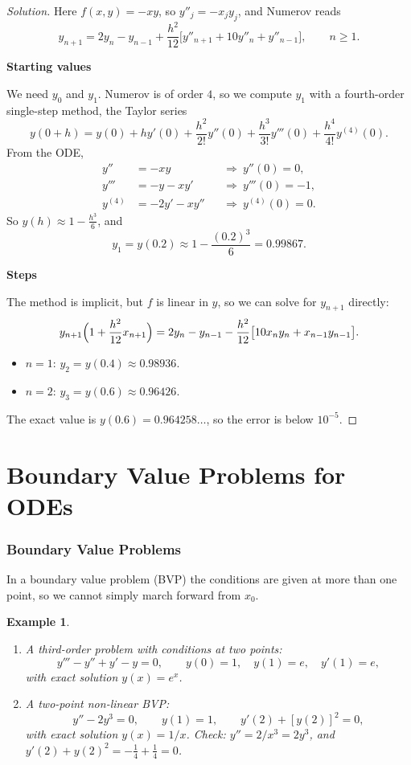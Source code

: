 \documentclass[11pt,a4paper]{article}
\numberwithin{equation}{section}
\theoremstyle{spacedplain}
\theoremstyle{spaceddefinition}
\newtheorem{example}[theorem]{Example}
\theoremstyle{spacedremark}
\newcommand{\step}[1]{\par\addvspace{0.6em}\noindent\textbf{#1}\par\nobreak}
\begin{document}
\begin{proof}[Solution]
Here \(f(x,y)=-xy\), so \(y''_j=-x_jy_j\), and Numerov reads
\[
  y_{n+1}=2y_n-y_{n-1}
  +\frac{h^2}{12}\bigl[y''_{n+1}+10y''_n+y''_{n-1}\bigr],
  \qquad n\ge1.
\]

\step{Starting values}
We need \(y_0\) and \(y_1\).  Numerov is of
order \(4\), so we compute \(y_1\) with a fourth-order single-step
method, the Taylor series
\[
  y(0+h)=y(0)+hy'(0)+\frac{h^2}{2!}y''(0)+\frac{h^3}{3!}y'''(0)
         +\frac{h^4}{4!}y^{(4)}(0).
\]
From the ODE,
\begin{align*}
  y''&=-xy &&\Rightarrow\ y''(0)=0,\\
  y'''&=-y-xy' &&\Rightarrow\ y'''(0)=-1,\\
  y^{(4)}&=-2y'-xy'' &&\Rightarrow\ y^{(4)}(0)=0.
\end{align*}
So \(y(h)\approx1-\frac{h^3}{6}\), and
\[
  y_1=y(0.2)\approx1-\frac{(0.2)^3}{6}=0.99867.
\]

\step{Steps}
The method is implicit, but \(f\) is linear in \(y\),
so we can solve for \(y_{n+1}\) directly:
\[
  y_{n+1}\Bigl(1+\frac{h^2}{12}x_{n+1}\Bigr)
  =2y_n-y_{n-1}-\frac{h^2}{12}\bigl[10x_ny_n+x_{n-1}y_{n-1}\bigr].
\]
\begin{itemize}
  \item \(n=1\): \(y_2=y(0.4)\approx0.98936\).
  \item \(n=2\): \(y_3=y(0.6)\approx\mathbf{0.96426}\).
\end{itemize}
The exact value is \(y(0.6)=0.964258\ldots\), so the error is below
\(10^{-5}\).
\end{proof}

\part{Boundary Value Problems for ODEs}

\section{Boundary Value Problems}

In a boundary value problem (BVP) the conditions are given at more than
one point, so we cannot simply march forward from \(x_0\).

\begin{example}
\leavevmode
\begin{enumerate}
  \item A third-order problem with conditions at two points:
    \[
      y'''-y''+y'-y=0,\qquad y(0)=1,\quad y(1)=e,\quad y'(1)=e,
    \]
    with exact solution \(y(x)=e^x\).
  \item A two-point non-linear BVP:
    \[
      y''-2y^3=0,\qquad y(1)=1,\qquad y'(2)+[y(2)]^2=0,
    \]
    with exact solution \(y(x)=1/x\).  Check: \(y''=2/x^3=2y^3\), and
    \(y'(2)+y(2)^2=-\frac14+\frac14=0\).
\end{enumerate}
\end{example}
\end{document}
